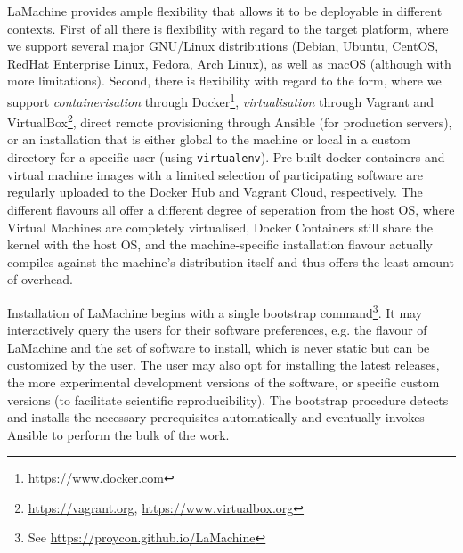 \documentclass[a4paper,11pt]{article}
\begin{document}
LaMachine provides ample flexibility that allows it to be deployable in different contexts. First of all there is
flexibility with regard to the target platform, where we support several major GNU/Linux distributions (Debian, Ubuntu,
CentOS, RedHat Enterprise Linux, Fedora, Arch Linux), as well as macOS (although with more limitations). Second, there is
flexibility with regard to the form, where we support \emph{containerisation} through
Docker\footnote{\url{https://www.docker.com}}, \emph{virtualisation} through Vagrant
and VirtualBox\footnote{\url{https://vagrant.org}, \url{https://www.virtualbox.org}}, direct remote provisioning through Ansible (for production
servers), or an installation that is either global to the machine or local in a custom directory for a specific user
(using \texttt{virtualenv}). Pre-built docker containers and virtual machine images with a limited selection of participating software are regularly
uploaded to the Docker Hub and Vagrant Cloud, respectively. The different flavours all offer a different degree of
seperation from the host OS, where Virtual Machines are completely virtualised, Docker Containers still share the kernel
with the host OS, and the machine-specific installation flavour actually compiles against the machine's distribution itself and thus
offers the least amount of overhead.

Installation of LaMachine begins with a single bootstrap command\footnote{See
\url{https://proycon.github.io/LaMachine}}.  It may interactively query the users for their software preferences, e.g.
the flavour of LaMachine and the set of software to install, which is never static but can be customized by the user.
The user may also opt for installing the latest releases, the more experimental development versions of the software, or
specific custom versions (to facilitate scientific reproducibility). The bootstrap procedure detects and installs
the necessary prerequisites automatically and eventually invokes Ansible to perform the bulk of the work.

%
%
\end{document}
